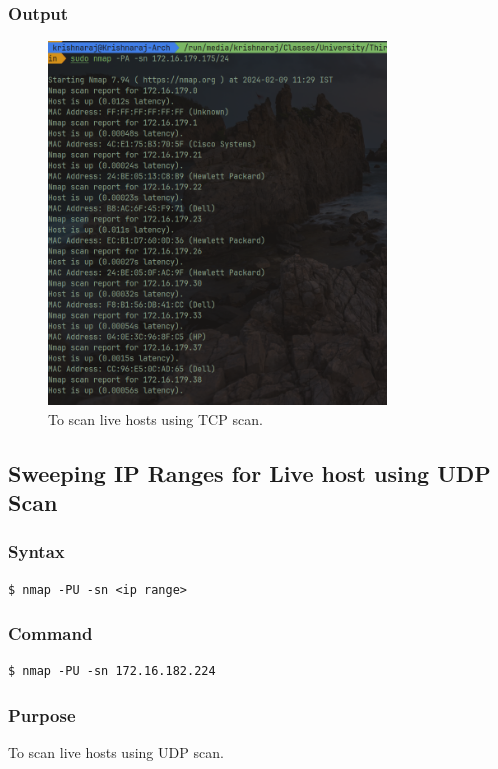 \documentclass[11pt]{article}
\begin{document}
\subsubsection*{Output}
\begin{figure}[H]
    \centering
    \includegraphics[width=0.8\textwidth]{tcp scan.png}
    \caption{To scan live hosts using TCP scan.}
    \label{fig:1}
\end{figure}


\subsection{Sweeping IP Ranges for Live host using UDP Scan}

\subsubsection{Syntax}
\begin{verbatim}
$ nmap -PU -sn <ip range>
\end{verbatim}

\subsubsection*{Command}
\begin{verbatim}
$ nmap -PU -sn 172.16.182.224
\end{verbatim}

\subsubsection*{Purpose}
To scan live hosts using UDP scan.
\end{document}

